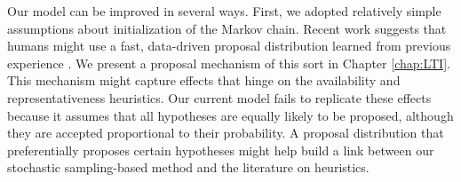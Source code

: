 
Our model can be improved in several ways. First, we adopted relatively simple assumptions about initialization of the Markov chain. Recent work suggests that humans might use a fast, data-driven proposal distribution learned from previous experience \citep{Yildirim15,Gershman2014b}. We present a proposal mechanism of this sort in Chapter \ref{chap:LTI}.
This mechanism might capture effects that hinge on the availability and representativeness heuristics. Our current model fails to replicate these effects because it assumes that all hypotheses are equally likely to be proposed, although they are accepted proportional to their probability. A proposal distribution that preferentially proposes certain hypotheses might help build a link between our stochastic sampling-based method and the literature on heuristics.


